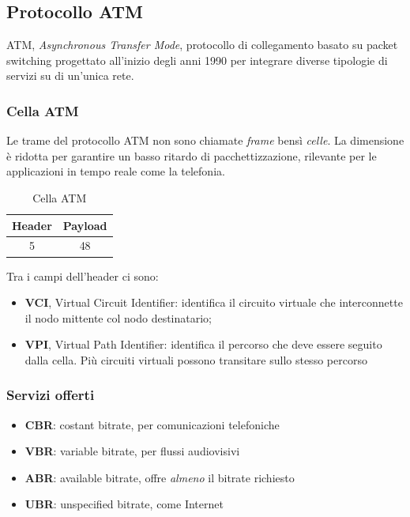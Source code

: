 \documentclass[12pt,a4paper]{article}
\begin{document}
\subsection{Protocollo ATM}
ATM, \emph{Asynchronous Transfer Mode}, protocollo di collegamento basato
su packet switching progettato all'inizio degli anni 1990 per integrare
diverse tipologie di servizi su di un'unica rete.

\subsubsection{Cella ATM}
Le trame del protocollo ATM non sono chiamate \emph{frame} bensì \emph{celle}.
La dimensione è ridotta per garantire un basso ritardo di pacchettizzazione,
rilevante per le applicazioni in tempo reale come la telefonia.

\begin{table}[H]
  \centering
  \begin{tabular}{| c | c |}\hline
  Header    & Payload \\ \hline
  5         & 48      \\ \hline
  \end{tabular}
  \caption{Cella ATM}
\end{table}

Tra i campi dell'header ci sono:
\begin{itemize}
  \item \textbf{VCI}, Virtual Circuit Identifier: identifica il circuito
    virtuale che interconnette il nodo mittente col nodo destinatario;
  \item \textbf{VPI}, Virtual Path Identifier: identifica il percorso
    che deve essere seguito dalla cella. Più circuiti virtuali possono
    transitare sullo stesso percorso
\end{itemize}

\subsubsection{Servizi offerti}
\begin{itemize}
  \item \textbf{CBR}: costant bitrate, per comunicazioni telefoniche
  \item \textbf{VBR}: variable bitrate, per flussi audiovisivi
  \item \textbf{ABR}: available bitrate, offre \emph{almeno} il bitrate
    richiesto
  \item \textbf{UBR}: unspecified bitrate, come Internet
\end{itemize}
\end{document}
